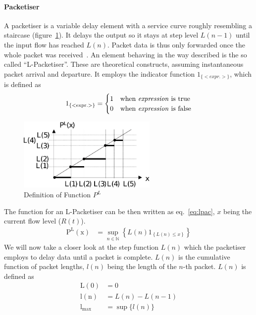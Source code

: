 \paragraph{Packetiser}
A packetiser is a variable delay element with a service curve roughly resembling a staircase (figure~\ref{fig:nc_pack}). 
It delays the output so it stays at step level $L(n-1)$ until the input flow has reached $L(n)$.
Packet data is thus only forwarded once the whole packet was received~\cite[pp. 218]{thiran_network_2001}.
An element behaving in the way described is the so called \enquote{L-Packetiser}. These are theoretical constructs, assuming instantaneous packet arrival and departure.
It employs the indicator function $1_{\{<expr.>\}}$, which is defined as
%
\begin{align}
\mathrm{1_{\{<expr.>\}}} = 
\begin{cases}
1 & \text{when \emph{expression} is true}\\
0 & \text{when \emph{expression} is false}
\end{cases}
\label{eq:func_ind}
\end{align}
%
\begin{figure}[H]
  \centering
  \includegraphics*[width=0.6\textwidth,height=\textheight,keepaspectratio]{Figures/nc_basics_pack}
  \caption{Definition of Function $P^L$~\cite{thiran_network_2001}}
  \label{fig:nc_pack}
\end{figure}
\noindent
The function for an L-Packetiser can be then written as eq.~\ref{eq:lpac}, $x$ being the current flow level ($R(t)$).
%
\begin{align}
\mathrm{P^L(x)} &= \sup_{n \in \mathbb{N}}\left\{ L(n)1_{\left\{L(n)\le x\right\}}\right\}
\label{eq:lpac}
\end{align}
%
We will now take a closer look at the step function $L(n)$ which the packetiser employs to delay data until a packet is complete.
$L(n)$ is the cumulative function of packet lengths,  $l(n)$ being the length of the $n$-th packet.
$L(n)$ is defined as
%
\begin{equation}
\begin{aligned}
\mathrm{L(0)} &= 0\\
\mathrm{l(n)} &= L(n) - L(n-1)\\
\mathrm{l_{max}} &= \sup \{l(n)\}
\label{eq:l_gen}
\end{aligned}
\end{equation}
